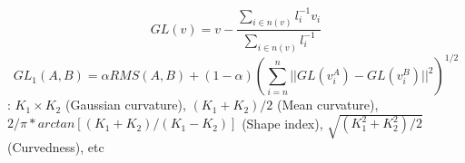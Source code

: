 \begin{equation}
GL(v)= v-\frac{\sum_{i \in n(v)}{l_i^{-1}v_i}}{\sum_{i \in n(v)}{l_i^{-1}}}
\end{equation}
\begin{equation}
GL_1(A,B)= \alpha RMS(A,B) + (1- \alpha)(\sum_{i=n}^n{||GL(v_i^A)-GL(v_i^B)||^2})^{1/2}
\end{equation}
: $ K_1 \times K_2$ (Gaussian curvature), $ (K_1+ K_2)/2$ (Mean curvature), $2/\pi *arctan[(K_1+ K_2)/( K_1- K_2)]$ (Shape index), $\sqrt{ (K_1^2+ K_2^2)/2}$ (Curvedness), etc
